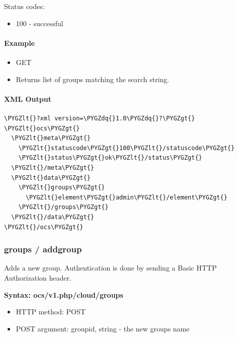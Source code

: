 \documentclass[letterpaper,10pt,english]{sphinxmanual}
\def\PYGZlt{\char`\<}
\def\PYGZgt{\char`\>}
\def\PYGZdq{\char`\"}
\begin{document}
Status codes:
\begin{itemize}
\item {} 
100 - successful

\end{itemize}


\paragraph{Example}
\label{configuration_user/user_provisioning_api:id20}\begin{itemize}
\item {} 
GET 

\item {} 
Returns list of groups matching the search string.

\end{itemize}


\paragraph{XML Output}
\label{configuration_user/user_provisioning_api:id21}
\begin{Verbatim}[commandchars=\\\{\}]
\PYGZlt{}?xml version=\PYGZdq{}1.0\PYGZdq{}?\PYGZgt{}
\PYGZlt{}ocs\PYGZgt{}
  \PYGZlt{}meta\PYGZgt{}
    \PYGZlt{}statuscode\PYGZgt{}100\PYGZlt{}/statuscode\PYGZgt{}
    \PYGZlt{}status\PYGZgt{}ok\PYGZlt{}/status\PYGZgt{}
  \PYGZlt{}/meta\PYGZgt{}
  \PYGZlt{}data\PYGZgt{}
    \PYGZlt{}groups\PYGZgt{}
      \PYGZlt{}element\PYGZgt{}admin\PYGZlt{}/element\PYGZgt{}
    \PYGZlt{}/groups\PYGZgt{}
  \PYGZlt{}/data\PYGZgt{}
\PYGZlt{}/ocs\PYGZgt{}
\end{Verbatim}


\subsubsection{\textbf{groups / addgroup}}
\label{configuration_user/user_provisioning_api:groups-addgroup}
Adds a new group. Authentication is done by
sending a Basic HTTP Authorization header.

\textbf{Syntax: ocs/v1.php/cloud/groups}
\begin{itemize}
\item {} 
HTTP method: POST

\item {} 
POST argument: groupid, string - the new groups name

\end{itemize}
\end{document}
